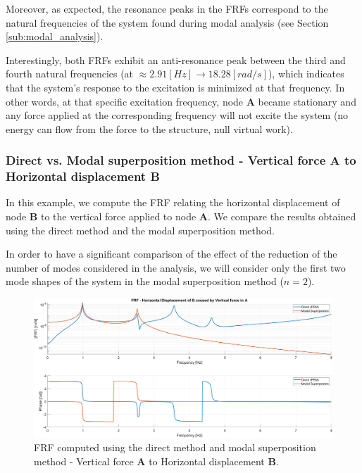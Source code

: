 Moreover, as expected, the resonance peaks in the FRFs correspond to the natural frequencies of the system found during modal analysis (see Section \ref{sub:modal_analysis}).

Interestingly, both FRFs exhibit an anti-resonance peak between the third and fourth natural frequencies (at $\approx 2.91 [Hz] \rightarrow 18.28 [rad/s]$), which indicates that the system's response to the excitation is minimized at that frequency.
In other words, at that specific excitation frequency, node \textbf{A} became stationary and any force applied at the corresponding frequency will not excite the system (no energy can flow from the force to the structure, null virtual work).


\subsubsection{Direct vs. Modal superposition method - Vertical force \textbf{A} to Horizontal displacement B}
\label{subsubsec:direct_vs_modal_vertical_force_A}

In this example, we compute the FRF relating the horizontal displacement of node \textbf{B} to the vertical force applied to node \textbf{A}.
We compare the results obtained using the direct method and the modal superposition method.

In order to have a significant comparison of the effect of the reduction of the number of modes considered in the analysis, we will consider only the first two mode shapes of the system in the modal superposition method ($n=2$).

\begin{figure}[H]
    \centering
    \includegraphics[width=\textwidth]{img/MATLAB/FRFs/Direct_vs_Modal.png}
    \caption{FRF computed using the direct method and modal superposition method - Vertical force \textbf{A} to Horizontal displacement \textbf{B}.}
    \label{fig:FRF_direct_vs_modal_vertical_A}
\end{figure}

